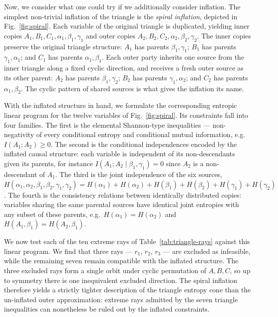 \documentclass[reprint,pra, twocolumn, amsmath,amssymb,
 aps,superscriptaddress,]{revtex4-2}
\begin{document}
Now, we consider what one could try if we additionally consider inflation.
The simplest non-trivial inflation of the triangle is the \emph{spiral inflation}, depicted in Fig.~\ref{fig:spiral}.
Each variable of the original triangle is duplicated, yielding inner copies $A_1, B_1, C_1, \alpha_1, \beta_1, \gamma_1$ and outer copies $A_2, B_2, C_2, \alpha_2, \beta_2, \gamma_2$.
The inner copies preserve the original triangle structure: $A_1$ has parents $\beta_1, \gamma_1$; $B_1$ has parents $\gamma_1, \alpha_1$; and $C_1$ has parents $\alpha_1, \beta_1$.
Each outer party inherits one source from the inner triangle along a fixed cyclic direction, and receives a fresh outer source as its other parent: $A_2$ has parents $\beta_1, \gamma_2$; $B_2$ has parents $\gamma_1, \alpha_2$; and $C_2$ has parents $\alpha_1, \beta_2$.
The cyclic pattern of shared sources is what gives the inflation its name.

With the inflated structure in hand, we formulate the corresponding entropic linear program for the twelve variables of Fig.~\ref{fig:spiral}.
Its constraints fall into four families.
The first is the elemental Shannon-type inequalities --- non-negativity of every conditional entropy and conditional mutual information, e.g.\ $I(A_1 ; A_2) \geq 0$.
The second is the conditional independences encoded by the inflated causal structure: each variable is independent of its non-descendants given its parents, for instance $I(A_1 ; A_2 \mid \beta_1, \gamma_1) = 0$ since $A_2$ is a non-descendant of $A_1$.
The third is the joint independence of the six sources, $H(\alpha_1, \alpha_2, \beta_1, \beta_2, \gamma_1, \gamma_2) = H(\alpha_1) + H(\alpha_2) + H(\beta_1) + H(\beta_2) + H(\gamma_1) + H(\gamma_2)$.
The fourth is the consistency relations between identically distributed copies: variables sharing the same parental sources have identical joint entropies with any subset of these parents, e.g.\ $H(\alpha_1) = H(\alpha_2)$ and $H(A_1, \beta_1) = H(A_2, \beta_1)$.

We now test each of the ten extreme rays of Table~\ref{tab:triangle-rays} against this linear program.
We find that three rays --- $r_1$, $r_2$, $r_3$ --- are excluded as infeasible, while the remaining seven remain compatible with the inflated structure.
The three excluded rays form a single orbit under cyclic permutation of $A, B, C$, so up to symmetry there is one inequivalent excluded direction.
The spiral inflation therefore yields a strictly tighter description of the triangle entropy cone than the un-inflated outer approximation: extreme rays admitted by the seven triangle inequalities can nonetheless be ruled out by the inflated constraints.
\end{document}
